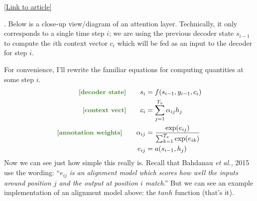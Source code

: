 \documentclass[11pt]{article}
\begin{document}
{\scriptsize \href{https://theneuralperspective.com/2016/11/20/recurrent-neural-network-rnn-part-4-attentional-interfaces/}{[Link to article]}}


\myspace
\p {}. Below is a close-up view/diagram of an attention layer. Technically, it only corresponds to a single time step $i$; we are using the previous decoder state $s_{i - 1}$ to compute the $i$th context vector $c_i$ which will be fed as an input to the decoder for step $i$. 

For convenience, I'll rewrite the familiar equations for computing quantities at some step $i$.
\begin{align}
\mgreen{\text{[decoder state]}} \qquad
s_i &= f(s_{i - 1}, y_{i - 1}, c_i) \\
\mgreen{\text{[context vect]}} \qquad
c_i &= \sum_{j = 1}^{T_x} \alpha_{ij} h_j \\
\mgreen{\text{[annotation weights]}} \qquad
\alpha_{ij} &= \frac{\exp(e_{ij})}{\sum_{k = 1}^{T_x} \exp(e_{ik})} \\
e_{ij} &= a(s_{i - 1}, h_j) 
\end{align}
Now we can see just how simple this really is. Recall that Bahdanau \textit{et al.,} 2015 use the wording: ``$e_{ij}$ \textit{is an alignment model which scores how well the inputs around position $j$ and the output at position $i$ match}.'' But we can see an example implementation of an alignment model above: the $tanh$ function (that's it).










\label{Appendix}
\end{document}
